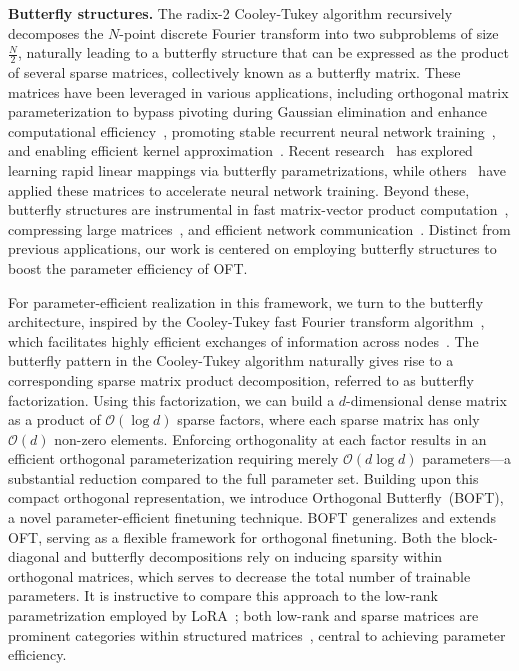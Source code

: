 \textbf{Butterfly structures.} The radix-2 Cooley-Tukey algorithm recursively decomposes the $N$-point discrete Fourier transform into two subproblems of size $\frac{N}{2}$, naturally leading to a butterfly structure that can be expressed as the product of several sparse matrices, collectively known as a butterfly matrix. These matrices have been leveraged in various applications, including orthogonal matrix parameterization to bypass pivoting during Gaussian elimination and enhance computational efficiency~\cite{parker1995random}, promoting stable recurrent neural network training~\cite{jing2017tunable}, and enabling efficient kernel approximation~\cite{munkhoeva2018quadrature}. Recent research~\cite{dao2019learning,dao2019kaleidoscope} has explored learning rapid linear mappings via butterfly parametrizations, while others~\cite{chen2022pixelated,dao2022monarch} have applied these matrices to accelerate neural network training. Beyond these, butterfly structures are instrumental in fast matrix-vector product computation~\cite{michielssen1996multilevel,o2010algorithm}, compressing large matrices~\cite{li2015butterfly}, and efficient network communication~\cite{klasing1994broadcasting,li2003linear,rajasingh2016transmission}. Distinct from previous applications, our work is centered on employing butterfly structures to boost the parameter efficiency of OFT.

For parameter-efficient realization in this framework, we turn to the butterfly architecture, inspired by the Cooley-Tukey fast Fourier transform algorithm~\cite{cooley1965algorithm}, which facilitates highly efficient exchanges of information across nodes~\cite{klasing1994broadcasting}. The butterfly pattern in the Cooley-Tukey algorithm naturally gives rise to a corresponding sparse matrix product decomposition, referred to as butterfly factorization. Using this factorization, we can build a $d$-dimensional dense matrix as a product of $\mathcal{O}(\log d)$ sparse factors, where each sparse matrix has only $\mathcal{O}(d)$ non-zero elements. Enforcing orthogonality at each factor results in an efficient orthogonal parameterization requiring merely $\mathcal{O}(d\log d)$ parameters—a substantial reduction compared to the full parameter set. Building upon this compact orthogonal representation, we introduce Orthogonal Butterfly~(BOFT), a novel parameter-efficient finetuning technique. BOFT generalizes and extends OFT, serving as a flexible framework for orthogonal finetuning. Both the block-diagonal and butterfly decompositions rely on inducing sparsity within orthogonal matrices, which serves to decrease the total number of trainable parameters. It is instructive to compare this approach to the low-rank parametrization employed by LoRA~\cite{hulora2022}; both low-rank and sparse matrices are prominent categories within structured matrices~\cite{candes2011robust}, central to achieving parameter efficiency.


